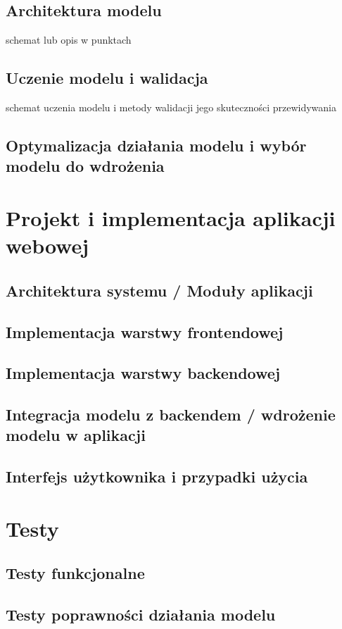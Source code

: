 \documentclass{iiuwb}
\begin{document}
\begin{itemize}
\subsection{Architektura modelu}
schemat lub opis w punktach
\subsection{Uczenie modelu i walidacja}
schemat uczenia modelu i metody walidacji jego skuteczności przewidywania
\subsection{Optymalizacja działania modelu i wybór modelu do wdrożenia}
\section{Projekt i implementacja aplikacji webowej}
\subsection{Architektura systemu / Moduły aplikacji}
\subsection{Implementacja warstwy frontendowej}
\subsection{Implementacja warstwy backendowej}
\subsection{Integracja modelu z backendem / wdrożenie modelu w aplikacji}
\subsection{Interfejs użytkownika i przypadki użycia}
\section{Testy}
\subsection{Testy funkcjonalne}
\subsection{Testy poprawności działania modelu}


\end{itemize}
\end{document}
